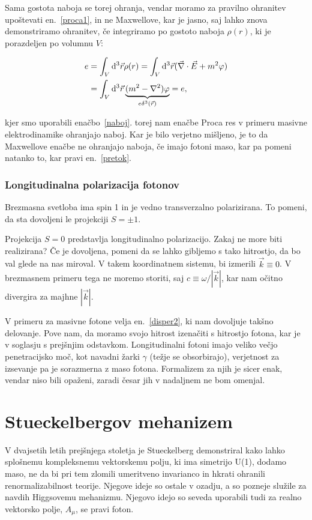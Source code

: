 \documentclass[a4paper, twocolumn, titlepage]{article}
\renewcommand{\div}{
	\ensuremath{\vec{\nabla}\cdot}
}
\newcommand{\ve}{
	\ensuremath{\vec{E}}
}
\newcommand{\w}{
	\ensuremath{\omega}
}
\renewcommand{\d}{
	\ensuremath{\mathrm{d}}
}
\begin{document}
Sama gostota naboja se torej ohranja, vendar moramo za pravilno ohranitev upoštevati en.~\eqref{proca1}, in ne Maxwellove,
kar je jasno, saj lahko znova demonstriramo ohranitev, če integriramo po gostoto naboja $\rho(r)$, ki je porazdeljen 
po volumnu $V$:

\begin{align}
	e &= \int_V \d^3\vec{r}\rho(r) = \int_V \d^3\vec{r}(\div\ve + m^2\varphi) \notag \\
	&=\int_V\d^3\vec{r}\underbrace{(m^2 - \nabla^2)\varphi}_{e\delta^3(\vec{r})} = e,
\end{align}

kjer smo uporabili enačbo~\eqref{naboj}.
torej nam enačbe Proca res v primeru masivne elektrodinamike ohranjajo naboj. Kar je bilo verjetno mišljeno, je to da 
Maxwellove enačbe ne ohranjajo naboja, če imajo fotoni maso, kar pa pomeni natanko to, kar pravi en.~\eqref{pretok}.

\subsubsection{Longitudinalna polarizacija fotonov}

Brezmasna svetloba ima spin 1 in je vedno transverzalno polarizirana. To pomeni, da sta dovoljeni le projekciji $S = \pm 1$.

Projekcija $S = 0$ predstavlja longitudinalno polarizacijo. Zakaj ne more biti realizirana? Če je dovoljena, pomeni da se
lahko
gibljemo s tako hitrostjo, da bo val glede na nas miroval. V takem koordinatnem sistemu, bi izmerili $\vec{k} \equiv 0$.
V brezmasnem primeru tega ne moremo storiti, saj $c \equiv \w/|\vec{k}|$, kar nam očitno divergira za majhne $|\vec{k}|$.

V primeru za masivne fotone velja en.~\eqref{disper2}, ki nam dovoljuje takšno delovanje. Pove nam, da moramo svojo hitrost
izenačiti s hitrostjo fotona, kar je v soglasju s prejšnjim odstavkom. Longitudinalni fotoni imajo veliko
večjo penetracijsko moč, kot navadni žarki $\gamma$ (težje se obsorbirajo), verjetnost za izsevanje pa je sorazmerna z
maso fotona. Formalizem za njih je sicer enak, vendar niso bili opaženi, zaradi česar jih v nadaljnem ne bom omenjal.

\section{Stueckelbergov mehanizem}

V dvajsetih letih prej\v snjega stoletja je Stueckelberg demonstriral kako lahko splo\v snemu kompleksnemu vektorskemu
polju, ki ima simetrijo U(1), dodamo maso, ne da bi pri tem zlomili umeritveno invarianco in hkrati ohranili
renormalizabilnost teorije. Njegove ideje so ostale v ozadju, a so pozneje slu\v zile za navdih Higgsovemu mehanizmu.
Njegovo idejo so seveda uporabili tudi za realno vektorsko polje, $A_\mu$, se pravi foton.
\end{document}
